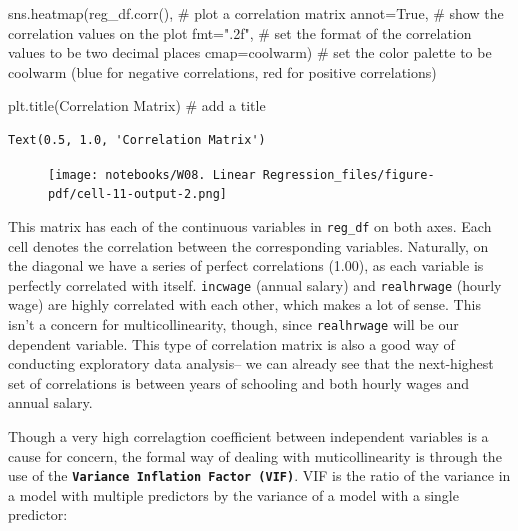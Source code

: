 \documentclass[
  letterpaper,
  DIV=11,
  numbers=noendperiod]{scrreprt}
\newenvironment{Shaded}{\begin{snugshade}}{\end{snugshade}}
\newcommand{\CommentTok}[1]{\textcolor[rgb]{0.37,0.37,0.37}{#1}}
\newcommand{\NormalTok}[1]{\textcolor[rgb]{0.00,0.23,0.31}{#1}}
\newcommand{\OperatorTok}[1]{\textcolor[rgb]{0.37,0.37,0.37}{#1}}
\newcommand{\StringTok}[1]{\textcolor[rgb]{0.13,0.47,0.30}{#1}}
\newcommand{\VariableTok}[1]{\textcolor[rgb]{0.07,0.07,0.07}{#1}}
\begin{document}
\begin{Shaded}
\begin{Highlighting}[]
\NormalTok{sns.heatmap(reg\_df.corr(), }\CommentTok{\# plot a correlation matrix }
\NormalTok{            annot}\OperatorTok{=}\VariableTok{True}\NormalTok{, }\CommentTok{\# show the correlation values on the plot}
\NormalTok{            fmt}\OperatorTok{=}\StringTok{".2f"}\NormalTok{, }\CommentTok{\# set the format of the correlation values to be two decimal places}
\NormalTok{            cmap}\OperatorTok{=}\StringTok{\textquotesingle{}coolwarm\textquotesingle{}}\NormalTok{) }\CommentTok{\# set the color palette to be coolwarm (blue for negative correlations, red for positive correlations)}

\NormalTok{plt.title(}\StringTok{\textquotesingle{}Correlation Matrix\textquotesingle{}}\NormalTok{) }\CommentTok{\# add a title}
\end{Highlighting}
\end{Shaded}

\begin{verbatim}
Text(0.5, 1.0, 'Correlation Matrix')
\end{verbatim}

\begin{figure}[H]

{\centering \texttt{[image: notebooks/W08. Linear Regression\_files/figure-pdf/cell-11-output-2.png]}

}

\end{figure}

This matrix has each of the continuous variables in \texttt{reg\_df} on
both axes. Each cell denotes the correlation between the corresponding
variables. Naturally, on the diagonal we have a series of perfect
correlations (1.00), as each variable is perfectly correlated with
itself. \texttt{incwage} (annual salary) and \texttt{realhrwage} (hourly
wage) are highly correlated with each other, which makes a lot of sense.
This isn't a concern for multicollinearity, though, since
\texttt{realhrwage} will be our dependent variable. This type of
correlation matrix is also a good way of conducting exploratory data
analysis-- we can already see that the next-highest set of correlations
is between years of schooling and both hourly wages and annual salary.

Though a very high correlagtion coefficient between independent
variables is a cause for concern, the formal way of dealing with
muticollinearity is through the use of the
\textbf{\texttt{Variance\ Inflation\ Factor\ (VIF)}}. VIF is the ratio
of the variance in a model with multiple predictors by the variance of a
model with a single predictor:
\end{document}
